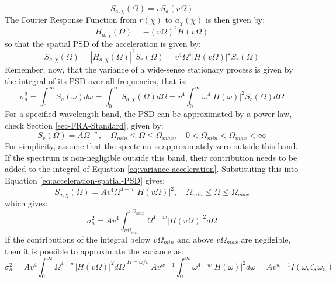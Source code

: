 \begin{equation}
    S_{a,\chi}(\Omega) = v S_{a}(v\Omega)
\end{equation}
The Fourier Response Function from $r(\chi)$ to $a_\chi(\chi)$ is then given by:
\begin{equation}
    H_{a,\chi}(\Omega) = -(v\Omega)^2 H(v\Omega)
\end{equation}
so that the spatial PSD of the acceleration is given by:
\begin{equation}
    S_{a,\chi}(\Omega) = |H_{a,\chi}(\Omega)|^2 S_r(\Omega) = v^4 \Omega^4 |H(v\Omega)|^2 S_r(\Omega)
    \label{eq:acceleration-spatial-PSD}
\end{equation}
Remember, now, that the variance of a wide-sense stationary process is given by the integral of its PSD over all frequencies, that is:
\begin{equation}
    \sigma^2_{a} = \int_{0}^{\infty} S_{a}(\omega) d\omega = \int_{0}^{\infty} S_{a,\chi}(\Omega) d\Omega =  v^4 \int_{0}^{\infty} \omega^4|H(\omega)|^2 S_r\left(\Omega\right) d\Omega
    \label{eq:variance-acceleration}
\end{equation}
For a specified wavelength band, the PSD can be approximated by a power law, check Section \ref{sec-FRA-Standard}, given by:
\begin{equation}
    S_r(\Omega) = A \Omega^{-w}, \quad \Omega_{min} \leq \Omega \leq \Omega_{max}, \quad 0 < \Omega_{min} < \Omega_{max} < \infty
\end{equation}
For simplicity, assume that the spectrum is approximately zero outside this band. If the spectrum is non-negligible outside this band, their contribution needs to be added to the integral of Equation \ref{eq:variance-acceleration}. Substituting this into Equation \ref{eq:acceleration-spatial-PSD} gives:
\begin{equation}
    S_{a,\chi}(\Omega) = A v^4 \Omega^{4-w} |H(v\Omega)|^2 , \quad \Omega_{min} \leq \Omega \leq \Omega_{max}
\end{equation}
which gives:
\begin{equation}
    \sigma^2_{a} = A v^4 \int_{v\Omega_{min}}^{v\Omega_{max}} \Omega^{4-w} |H(v\Omega)|^2 d\Omega
    \label{eq:variance-acceleration-approx}
\end{equation}
If the contributions of the integral below $v\Omega_{min}$ and above $v\Omega_{max}$ are negligible, then it is possible to approximate the variance as:
\begin{equation}
    \sigma^2_{a} = A v^4 \int_{0}^{\infty} \Omega^{4-w} |H(v\Omega)|^2 d\Omega
    \overset{\Omega = \omega/v}{=} A v^{w-1} \int_{0}^{\infty} \omega^{4-w} |H(\omega)|^2 d\omega = A v^{w-1} I(\omega, \zeta, \omega_n)
\end{equation}
